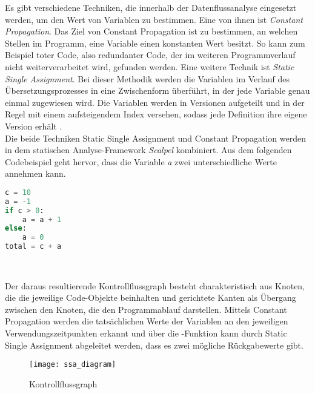 \documentclass[german,bachelor]{swsLeipzig}
\begin{document}
Es gibt verschiedene Techniken, die innerhalb der Datenflussanalyse eingesetzt werden, um den Wert von Variablen zu bestimmen.
Eine von ihnen ist \textit{Constant Propagation}.
Das Ziel von Constant Propagation ist zu bestimmen, an welchen Stellen im Programm, eine Variable einen konstanten Wert besitzt.
So kann zum Beispiel toter Code, also redundanter Code, der im weiteren Programmverlauf nicht weiterverarbeitet wird, gefunden werden.
Eine weitere Technik ist \textit{Static Single Assignment}.
Bei dieser Methodik werden die Variablen im Verlauf des Übersetzungsprozesses in eine Zwischenform überführt, in der jede Variable
genau einmal zugewiesen wird.
Die Variablen werden in Versionen aufgeteilt und in der Regel mit einem aufsteigendem Index versehen,
sodass jede Definition ihre eigene Version erhält \cite[]{li2022scalpel}.\\
\indent Die beide Techniken Static Single Assignment und Constant Propagation werden in dem statischen Analyse-Framework
\textit{Scalpel} kombiniert.
Aus dem folgenden Codebeispiel geht hervor, dass die Variable \textit{a} zwei unterschiedliche Werte annehmen kann.\\

\noindent\begin{minipage}{\linewidth}
\begin{lstlisting}[language=Python, frame=single, basicstyle=\small, caption={Codebeispiel von Scalpel für Datenflussanalyse {\cite[]{li2022scalpel}}},captionpos=b]
c = 10
a = -1
if c > 0:
    a = a + 1
else:
    a = 0
total = c + a
\end{lstlisting}
\end{minipage}
\

Der daraus resultierende Kontrollflussgraph besteht charakteristisch aus Knoten, die die jeweilige Code-Objekte beinhalten und gerichtete Kanten als Übergang
zwischen den Knoten, die den Programmablauf darstellen.
Mittels Constant Propagation werden die tatsächlichen Werte der Variablen an den jeweiligen Verwendungszeitpunkten erkannt
und über die \textPhi-Funktion kann durch Static Single Assignment abgeleitet werden, dass es zwei mögliche Rückgabewerte gibt.

\begin{figure}[h]
 \centering
 \texttt{[image: ssa\_diagram]}
 \caption{Kontrollflussgraph \cite[]{li2022scalpel}}
 \label{fig:scalpel}
\end{figure}
\end{document}
